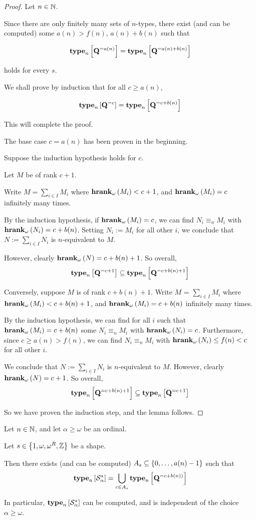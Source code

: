\begin{proof}
  Let $n \in \mathbb{N}$.

  Since there are only finitely many sets of $n$-types,
  there exist (and can be computed)
  some $a(n) > f(n)$, $a(n) + b(n)$ such that

  $$\mathbf{type}_{n} \left[ {\mathbf{Q}^{= a(n)}} \right] = \mathbf{type}_{n} \left[ {\mathbf{Q}^{= a(n) + b(n)}} \right]$$

  holds for every $s$.

  We shall prove by induction that for all $c \ge a(n)$,

  $$\mathbf{type}_{n} \left[ {\mathbf{Q}^{= c}} \right] = \mathbf{type}_{n} \left[ {\mathbf{Q}^{= c + b(n)}} \right]$$

  This will complete the proof.

  The base case $c = a(n)$ has been proven in the beginning.

  Suppose the induction hypothesis holds for $c$.

  Let $M$ be of rank $c + 1$.

  Write $M = \sum_{i \in I} M_i$ where $\mathbf{hrank}_{\omega}\left( M_i \right) < c + 1$,
  and $\mathbf{hrank}_{\omega}\left( M_i \right) = c$ infinitely many times.

  By the induction hypothesis,
  if $\mathbf{hrank}_{\omega}\left( M_i \right) = c$, we can find $N_i \equiv_n M_i$ with $\mathbf{hrank}_{\omega}\left( N_i \right) = c + b(n)$.
  Setting $N_i := M_i$ for all other $i$, we conclude that $N := \sum_{i \in I} N_i$
  is $n$-equivalent to $M$.

  However, clearly $\mathbf{hrank}_{\omega}\left( N \right) = c + b(n) + 1$. So overall,
  $$\mathbf{type}_{n} \left[ {\mathbf{Q}^{= c + 1}} \right] \subseteq \mathbf{type}_{n} \left[ {\mathbf{Q}^{= c + b(n) + 1}} \right]$$

  Conversely, suppose $M$ is of rank $c + b(n) + 1$.
  Write $M$ = $\sum_{i \in I} M_i$ where $\mathbf{hrank}_{\omega}\left( M_i \right) < c + b(n) + 1$,
  and $\mathbf{hrank}_{\omega}\left( M_i \right) = c + b(n)$ infinitely many times.

  By the induction hypothesis,
  we can find for all $i$ such that $\mathbf{hrank}_{\omega}\left( M_i \right) = c + b(n)$ some
  $N_i \equiv_n M_i$ with $\mathbf{hrank}_{\omega}\left( N_i \right) = c$.
  Furthermore, since $c \ge a(n) > f(n)$, we can
  find $N_i \equiv_n M_i$ with $\mathbf{hrank}_{\omega}\left( N_i \right) \le f(n) < c$ for all other $i$.

  We conclude that $N := \sum_{i \in I} N_i$ is $n$-equivalent to $M$.
  However, clearly $\mathbf{hrank}_{\omega}\left( N \right) = c + 1$. So overall,
  $$\mathbf{type}_{n} \left[ {\mathbf{Q}^{= c + b(n) + 1}} \right] \subseteq \mathbf{type}_{n} \left[ {\mathbf{Q}^{= c + 1}} \right]$$

  So we have proven the induction step, and the lemma follows.
\end{proof}

\begin{lemma}
  Let $n \in \mathbb{N}$, and let $\alpha \ge \omega$ be an ordinal.

  Let $s \in \left\{ {1, \omega, \omega^R, \mathbb{Z}} \right\}$ be a shape.

  Then there exists (and can be computed) $A_s \subseteq \left\{ {0, \ldots, a(n) - 1} \right\}$ such that
  $$\mathbf{type}_{n} \left[ {\mathcal{S}^{s}_{\alpha}} \right] = \bigcup_{c \in A_s}{\mathbf{type}_{n} \left[ {\mathbf{Q}^{= c + b(n))}} \right]}$$

  In particular, $\mathbf{type}_{n} \left[ {\mathcal{S}^{s}_{\alpha}} \right]$ can be
  computed, and is independent of the choice $\alpha \ge \omega$.
\end{lemma}

